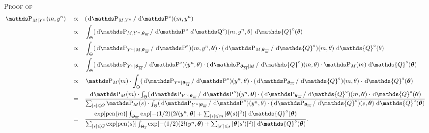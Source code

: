 \begin{pro}{\textsc{Proof of } \\}\label{PRO_BAYES_HIERARCHICAL_ITERATED}
\begin{alignat*}{3}
& \P_{M \vert Y^{n}}(m, y^{n}) &&\propto&& (\d\P_{M, Y^{n}}/\d\P^{\circ})(m, y^{n})\\
& && \propto && \int_{\Theta}(\d\P_{M, Y^{n}, \boldsymbol{\theta}_{\overline{m}}}/\d\P^{\circ} \, d\Q^{\circ})(m, y^{n}, \theta)\d\mathds{Q}^{\circ}(\theta)\\
& &&\propto&&\int_{\Theta}(\d\P_{Y^{n} \vert M, \boldsymbol{\theta}_{\overline{M}}}/\d\P^{\circ})(m, y^{n}, \boldsymbol{\theta}) \cdot (\d\P_{M, \boldsymbol{\theta}_{\overline{M}}}/\d\mathds{Q}^{\circ})(m, \theta)\d\mathds{Q}^{\circ}(\theta)\\
& &&\propto&&\int_{\Theta}(\d\P_{Y^{n} \vert \boldsymbol{\theta}_{\overline{M}}}/\d\P^{\circ})(y^{n}, \theta) \cdot (\d\P_{\boldsymbol{\theta}_{\overline{M}}\vert M}/\d\mathds{Q}^{\circ})(m, \theta) \cdot \P_{M}(m)\d\mathds{Q}^{\circ}(\boldsymbol{\theta})\\
& &&\propto&& \P_{M}(m) \cdot \int_{\Theta}(\d\P_{Y^{n} \vert \boldsymbol{\theta}_{\overline{M}}}/\d\P^{\circ})(y^{n}, \theta) \cdot (\d\P_{\boldsymbol{\theta}_{\overline{m}}}/\d\mathds{Q}^{\circ})(m, \theta) \cdot \d\mathds{Q}^{\circ}(\boldsymbol{\theta})\\
& && = && \frac{\d\P_{M}(m) \cdot \int_{\Theta}( \d \P_{Y^{n} \vert \boldsymbol{\theta}_{\overline{m}}}/\d\P^{\circ})(y^{n}, \boldsymbol{\theta}) \cdot (\d\P_{\boldsymbol{\theta}_{\overline{m}}}/ \d\mathds{Q}^{\circ})(m, \boldsymbol{\theta}) \cdot \d\mathds{Q}^{\circ}(\boldsymbol{\theta})}{\sum\nolimits_{\vert s \vert \leq G} \P_{M}(s) \cdot \int_{\Theta}(\d\P_{Y^{n} \vert \boldsymbol{\theta}_{\overline{m}}}/\d\P^{\circ})(y^{n}, \theta) \cdot (\d\P_{\boldsymbol{\theta}_{\overline{m}}}/\d\mathds{Q}^{\circ})(s, \boldsymbol{\theta}) \d\mathds{Q}^{\circ}(\boldsymbol{\theta})}\\
& && = && \frac{\exp[\pen(m)] \int_{\Theta_{\overline{m}}}\exp[-(1/2)(2 l(y^{n}, \boldsymbol{\theta}) + \sum\nolimits_{\vert s \vert \leq m} \vert \boldsymbol{\theta}(s) \vert^{2})] \d\mathds{Q}^{\circ}(\boldsymbol{\theta})}{\sum\nolimits_{\vert s \vert \leq G}\exp[\pen(s)] \int_{\Theta_{\overline{s}}}\exp[-(1/2)(2 l(y^{n}, \boldsymbol{\theta}) + \sum\nolimits_{\vert s' \vert \leq s} \vert \boldsymbol{\theta}(s') \vert^{2})] \d\mathds{Q}^{\circ}(\boldsymbol{\theta})}.
\end{alignat*}
\proEnd
\end{pro}

